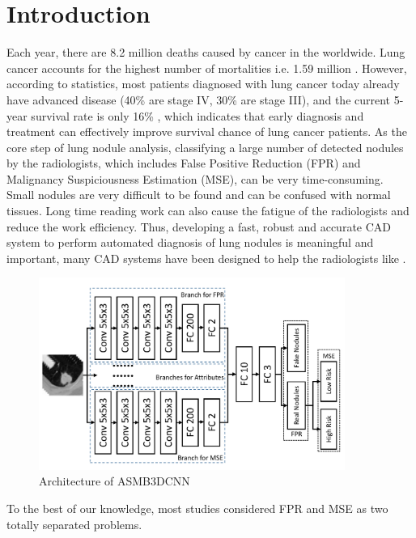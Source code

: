 \documentclass[runningheads]{llncs}
\begin{document}
\section{Introduction}
Each year, there are 8.2 million deaths caused by cancer in the worldwide. Lung cancer accounts for the highest number of mortalities i.e. 1.59 million \cite{Wild2014International}. However, according to statistics, most patients diagnosed with lung cancer today already have advanced disease (40\% are stage IV, 30\% are stage III), and the current 5-year survival rate is only 16\% \cite{Bach2012Benefits}, which indicates that early diagnosis and treatment can effectively improve survival chance of lung cancer patients. As the core step of lung nodule analysis, classifying a large number of detected nodules by the radiologists, which includes False Positive Reduction (FPR) and Malignancy Suspiciousness Estimation (MSE), can be very time-consuming. Small nodules are very difficult to be found and can be confused with normal tissues. Long time reading work can also cause the fatigue of the radiologists and reduce the work efficiency. Thus, developing a fast, robust and accurate CAD system to perform automated diagnosis of lung nodules is meaningful and important\cite{Greenspan2016Guest}, many CAD systems have been designed to help the radiologists like \cite{rajpurkar2017chexnet} \cite{wang2018tienet} \cite{Causey2018Highly} \cite{nanwu2019dnn}.

\begin{figure}[*t]
\centerline{\includegraphics[width=100mm]{fig1.pdf}}
\vspace{-0.0cm}
\caption{Architecture of ASMB3DCNN}
\vspace{-0.5cm}
\label{fig1}
\end{figure}


To the best of our knowledge, most studies considered FPR and MSE as two totally separated problems.
\end{document}

